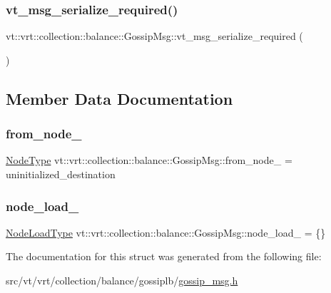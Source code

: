 \subsubsection{\texorpdfstring{vt\+\_\+msg\+\_\+serialize\+\_\+required()}{vt\_msg\_serialize\_required()}}
{\footnotesize\ttfamily vt\+::vrt\+::collection\+::balance\+::\+Gossip\+Msg\+::vt\+\_\+msg\+\_\+serialize\+\_\+required (\begin{DoxyParamCaption}{ }\end{DoxyParamCaption})}



\subsection{Member Data Documentation}
\mbox{\label{structvt_1_1vrt_1_1collection_1_1balance_1_1_gossip_msg_a8e53b7f4976cf2963e33c8c2c13bbf48}} 
\subsubsection{\texorpdfstring{from\+\_\+node\+\_\+}{from\_node\_}}
{\footnotesize\ttfamily \hyperlink{namespacevt_a866da9d0efc19c0a1ce79e9e492f47e2}{Node\+Type} vt\+::vrt\+::collection\+::balance\+::\+Gossip\+Msg\+::from\+\_\+node\+\_\+ = uninitialized\+\_\+destination\hspace{0.3cm}{\ttfamily [private]}}

\mbox{\label{structvt_1_1vrt_1_1collection_1_1balance_1_1_gossip_msg_aca0029407939a6ee94fde942a009a8eb}} 
\subsubsection{\texorpdfstring{node\+\_\+load\+\_\+}{node\_load\_}}
{\footnotesize\ttfamily \hyperlink{structvt_1_1vrt_1_1collection_1_1balance_1_1_gossip_msg_a8deef056cb137cfd67540a31be189122}{Node\+Load\+Type} vt\+::vrt\+::collection\+::balance\+::\+Gossip\+Msg\+::node\+\_\+load\+\_\+ = \{\}\hspace{0.3cm}{\ttfamily [private]}}



The documentation for this struct was generated from the following file\+:\begin{DoxyCompactItemize}
\item 
src/vt/vrt/collection/balance/gossiplb/\hyperlink{gossip__msg_8h}{gossip\+\_\+msg.\+h}\end{DoxyCompactItemize}
